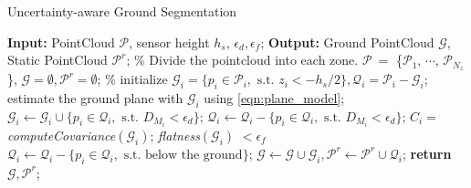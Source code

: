\begin{algorithm}[!b]
   \begin{algorithmic}[1]
   \footnotesize
    \caption{Uncertainty-aware Ground Segmentation}
    \label{alg:ground}
    \State  \textbf{Input:} PointCloud $\mathcal{P}$, sensor height $h_s$, $\epsilon_d, \epsilon_f$; 
    \State  \textbf{Output:} Ground PointCloud $\mathcal{G}$, Static PointCloud $\mathcal{P}^r$;
    \State \% Divide the pointcloud into each zone.
    \State $\mathcal{P} \ = $ \{$\mathcal{P}_1$, $\cdots$, $\mathcal{P}_{N_z}$\}, $\mathcal{G}=\emptyset, \mathcal{P}^r=\emptyset$;
        \State \% initialize
        \State $\mathcal{G}_i = \{p_i\in \mathcal{P}_i, \text{ s.t. } z_i<-h_s/2\}, \mathcal{Q}_i=\mathcal{P}_i-\mathcal{G}_i$;
        \Repeat
        \State estimate the ground plane with $\mathcal{G}_i$ using \eqref{eqn:plane_model};
        \State $\mathcal{G}_i \leftarrow \mathcal{G}_i \cup \{ p_i\in \mathcal{Q}_i, \text{ s.t. } D_{M_i}<\epsilon_d \}$;
        \State $\mathcal{Q}_i \leftarrow \mathcal{Q}_i - \{ p_i\in \mathcal{Q}_i, \text{ s.t. } D_{M_i}<\epsilon_d \}$;
        \State $C_i =$ \textit{computeCovariance}$(\mathcal{G}_i)$;
        \Until \textit{flatness}$(\mathcal{G}_i)$ $<\epsilon_f$
        \State $\mathcal{Q}_i\leftarrow\mathcal{Q}_i-\{ p_i\in \mathcal{Q}_i, \text{ s.t. below the ground} \}$;
        \State $\mathcal{G}\leftarrow\mathcal{G}\cup\mathcal{G}_i, \mathcal{P}^r\leftarrow\mathcal{P}^r\cup\mathcal{Q}_i$;
        \EndIf
    \EndFor
    \State \textbf{return} $\mathcal{G}, \mathcal{P}^r$;
    \normalsize
    \end{algorithmic}
\end{algorithm}